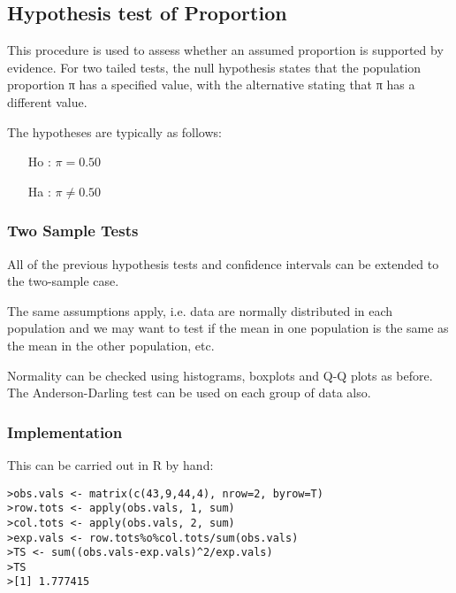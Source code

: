 \documentclass[a4paper,12pt]{article}
\begin{document}
\newpage


\newpage




\subsection{Hypothesis test of Proportion}
This procedure is used to assess whether an assumed proportion is supported by evidence. For two tailed tests, the null hypothesis states that the population proportion  π has a specified value, with the alternative stating that π has a different value. 

The hypotheses are typically as follows:   

\begin{itemize}
	\item[Ho] : $\pi = 0.50$
	\item[Ha] : $\pi \neq 0.50$
\end{itemize}


\subsubsection{Two Sample Tests}


All of the previous hypothesis tests and confidence intervals can be
extended to the two-sample case.

The same assumptions apply, i.e. data are normally distributed in
each population and we may want to test if the mean in one
population is the same as the mean in the other population, etc.

Normality can be checked using histograms, boxplots and Q-Q
plots as before. The Anderson-Darling test can be used on
each group of data also.


\subsubsection{Implementation}

This can be carried out in R by hand:

\footnotesize \begin{verbatim}
>obs.vals <- matrix(c(43,9,44,4), nrow=2, byrow=T)
>row.tots <- apply(obs.vals, 1, sum)
>col.tots <- apply(obs.vals, 2, sum)
>exp.vals <- row.tots%o%col.tots/sum(obs.vals)
>TS <- sum((obs.vals-exp.vals)^2/exp.vals)
>TS
>[1] 1.777415
\end{verbatim}\normalsize
\end{document}
